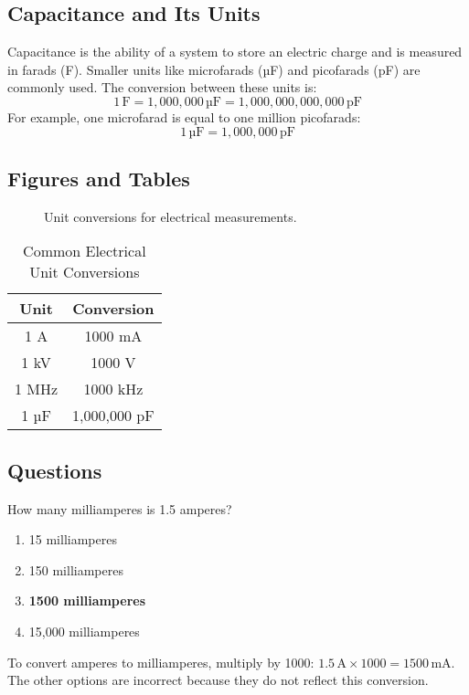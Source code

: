 \subsection*{Capacitance and Its Units}
Capacitance is the ability of a system to store an electric charge and is measured in farads (F). Smaller units like microfarads (µF) and picofarads (pF) are commonly used. The conversion between these units is:
\begin{equation}
1 \, \text{F} = 1,000,000 \, \text{µF} = 1,000,000,000,000 \, \text{pF}
\end{equation}
For example, one microfarad is equal to one million picofarads:
\begin{equation}
1 \, \text{µF} = 1,000,000 \, \text{pF}
\end{equation}

\subsection*{Figures and Tables}
\begin{figure}[h]
    \centering
    \caption{Unit conversions for electrical measurements.}
    \label{fig:unit_conversions}
\end{figure}

\begin{table}[h]
    \centering
    \caption{Common Electrical Unit Conversions}
    \label{tab:unit_conversions}
    \begin{tabular}{|c|c|}
        \hline
        \textbf{Unit} & \textbf{Conversion} \\
        \hline
        1 A & 1000 mA \\
        1 kV & 1000 V \\
        1 MHz & 1000 kHz \\
        1 µF & 1,000,000 pF \\
        \hline
    \end{tabular}
\end{table}

\subsection*{Questions}
\begin{tcolorbox}[colback=gray!10!white,colframe=black!75!black,title={T5B01}]
    How many milliamperes is 1.5 amperes?
    \begin{enumerate}[label=\Alph*),noitemsep]
        \item 15 milliamperes
        \item 150 milliamperes
        \item \textbf{1500 milliamperes}
        \item 15,000 milliamperes
    \end{enumerate}
\end{tcolorbox}
To convert amperes to milliamperes, multiply by 1000: \(1.5 \, \text{A} \times 1000 = 1500 \, \text{mA}\). The other options are incorrect because they do not reflect this conversion.

